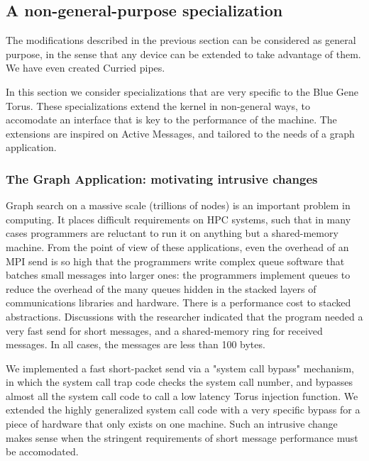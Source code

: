 \documentclass[letterpaper,twocolumn,10pt]{article}
\begin{document}
\subsection{A non-general-purpose specialization}
The modifications described in the previous section can be considered as general purpose, in the sense 
that any device can be extended to take advantage of them. We have even created Curried pipes. 

In this section we consider specializations that are very specific to the Blue Gene Torus. These specializations extend the kernel in non-general ways, to accomodate an interface that is key to the performance of the machine. The extensions are inspired on Active Messages,  and tailored to the needs of a graph application. 

\subsubsection{The Graph Application: motivating intrusive changes}

Graph search on a massive scale (trillions of nodes)
is an important problem in computing. It places difficult requirements on HPC systems, such that in many cases
programmers are reluctant to run it on anything but a shared-memory machine. 
From the point of view of these applications, even the overhead of an MPI send is so high that the programmers write complex 
queue software that batches small messages into larger ones: the programmers implement queues to reduce the overhead of the many
queues hidden in the stacked layers  of communications libraries and hardware. There is a performance cost to stacked abstractions. 
Discussions with the researcher indicated that the program needed a very fast send for short messages, and a shared-memory ring for received
messages. In all cases, the messages are less than 100 bytes. 

We implemented a fast short-packet send via a "system call bypass" mechanism, in which the system call trap code
checks the system call number, and bypasses almost all the system call code to call a low latency 
Torus injection function. We
extended the highly generalized system call code with a very specific bypass for a piece of hardware that only exists on 
one machine. Such an intrusive change makes sense when the stringent requirements of short message 
performance must be accomodated. 
\end{document}
